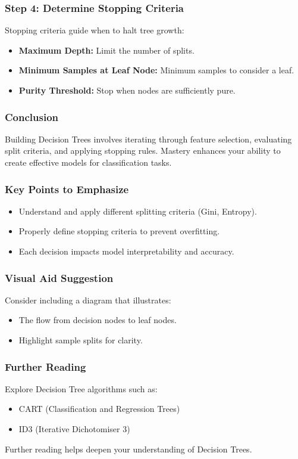 \documentclass[aspectratio=169]{beamer}
\begin{document}
\begin{frame}[fragile]
    \frametitle{Step 4: Determine Stopping Criteria}
    Stopping criteria guide when to halt tree growth:
    \begin{itemize}
        \item \textbf{Maximum Depth:} Limit the number of splits.
        \item \textbf{Minimum Samples at Leaf Node:} Minimum samples to consider a leaf.
        \item \textbf{Purity Threshold:} Stop when nodes are sufficiently pure.
    \end{itemize}
\end{frame}

\begin{frame}[fragile]
    \frametitle{Conclusion}
    Building Decision Trees involves iterating through feature selection, evaluating split criteria, and applying stopping rules. Mastery enhances your ability to create effective models for classification tasks.
\end{frame}

\begin{frame}[fragile]
    \frametitle{Key Points to Emphasize}
    \begin{itemize}
        \item Understand and apply different splitting criteria (Gini, Entropy).
        \item Properly define stopping criteria to prevent overfitting.
        \item Each decision impacts model interpretability and accuracy.
    \end{itemize}
\end{frame}

\begin{frame}[fragile]
    \frametitle{Visual Aid Suggestion}
    Consider including a diagram that illustrates:
    \begin{itemize}
        \item The flow from decision nodes to leaf nodes.
        \item Highlight sample splits for clarity.
    \end{itemize}
\end{frame}

\begin{frame}[fragile]
    \frametitle{Further Reading}
    Explore Decision Tree algorithms such as:
    \begin{itemize}
        \item CART (Classification and Regression Trees)
        \item ID3 (Iterative Dichotomiser 3)
    \end{itemize}
    Further reading helps deepen your understanding of Decision Trees.
\end{frame}
\end{document}
